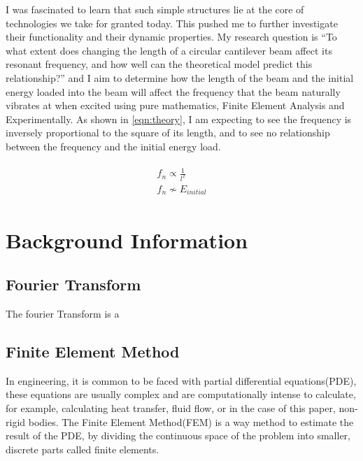 \documentclass[a4paper,12pt]{article}
\newcommand{\ResearchQ}{To what extent does changing the length of a circular cantilever beam affect its resonant frequency, and how well can the theoretical model predict this relationship?}
\begin{document}
I was fascinated to learn that such simple structures lie at the core of technologies we take for granted today. This pushed me to further investigate their functionality and their dynamic properties. My research question is ``\ResearchQ'' and
I aim to determine how the length of the beam and the initial energy loaded into the beam will affect the frequency that the beam naturally vibrates at when excited using pure mathematics, Finite Element Analysis and Experimentally.
As shown in \eqref{eqn:theory}, I am expecting to see the frequency is inversely proportional to the square of its length, and to see no relationship between the frequency and the initial energy load.

\begin{align}%
\label{eqn:theory}
\begin{split}
f_{n}\propto \frac{1}{l^{2}}
\\
f_{n}\not\sim E_{initial}
\end{split}
\end{align}






\section{Background Information}%
    \subsection{Fourier Transform} \label{FT}
    The fourier Transform is a
    \pagebreak
    \subsection{Finite Element Method}\label{FEM}%
    In engineering, it is common to be faced with partial differential equations(PDE), these equations are usually complex and are computationally intense to calculate, for example, calculating heat transfer, fluid flow, or in the case of this paper, non-rigid bodies.
    The Finite Element Method(FEM) is a way method to estimate the result of the PDE, by dividing the continuous space of the problem into smaller, discrete parts called finite elements.
\end{document}
